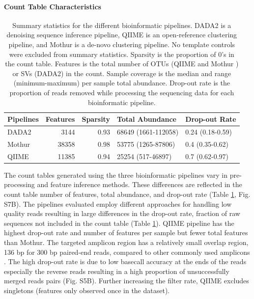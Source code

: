 \documentclass{bmcart}
\begin{document}
\paragraph{Count Table Characteristics}
\begin{table}
\caption{\label{tab:pipeQA}Summary statistics for the different bioinformatic pipelines.
DADA2 is a denoising sequence inference pipeline, QIIME is an open-reference clustering
pipeline, and Mothur  is a de-novo clustering pipeline. No template controls were excluded
from summary statistics. Sparsity is the proportion of 0's in the count table. Features
is the total number of OTUs (QIIME and Mothur ) or SVs (DADA2) in the count. Sample
coverage is the median and range (minimum-maximum) per sample total abundance.
Drop-out rate is the proportion of reads removed while processing the sequencing data for each bioinformatic pipeline.}
\centering
\begin{tabular}[t]{lrrll}
\toprule
Pipelines & Features & Sparsity & Total Abundance & Drop-out Rate\\
\midrule
DADA2 & 3144 & 0.93 & 68649 (1661-112058) & 0.24 (0.18-0.59)\\
Mothur & 38358 & 0.98 & 53775 (1265-87806) & 0.4 (0.35-0.62)\\
QIIME & 11385 & 0.94 & 25254 (517-46897) & 0.7 (0.62-0.97)\\
\bottomrule
\end{tabular}
\end{table}

The count tables generated using the three bioinformatic pipelines vary in
pre-processing and feature inference methods. 
These differences are reflected in the count table number of features, total abundance,
and drop-out rate (Table \ref{tab:pipeQA}, Fig. S7B). The
pipelines evaluated employ different approaches for handling low quality
reads resulting in large differences in the drop-out rate, fraction
of raw sequences not included in the count table (Table
\ref{tab:pipeQA}). QIIME pipeline has the highest drop-out rate and
number of features per sample but fewer total features than Mothur. The
targeted amplicon region has a relatively small overlap region, 136 bp
for 300 bp paired-end reads, compared to other commonly used amplicons
\cite{kozich2013development, Walters2016-lf}. The high drop-out rate is
due to low basecall accuracy at the ends of the reads especially the
reverse reads resulting in a high proportion of unsuccessfully merged
reads pairs (Fig. S5B). Further increasing the
filter rate, QIIME excludes singletons (features only observed once in
the dataset).
\end{document}
